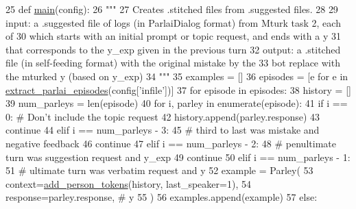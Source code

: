 \begin{DoxyCode}
25 \textcolor{keyword}{def }\hyperlink{namespaceprojects_1_1self__feeding_1_1scripts_1_1convert__suggested__to__stitched_a6616af45a9b73cd0314c3d585d66d5f8}{main}(config):
26     \textcolor{stringliteral}{"""}
27 \textcolor{stringliteral}{    Creates .stitched files from .suggested files.}
28 \textcolor{stringliteral}{}
29 \textcolor{stringliteral}{    input: a .suggested file of logs (in ParlaiDialog format) from Mturk task 2, each of}
30 \textcolor{stringliteral}{        which starts with an initial prompt or topic request, and ends with a y}
31 \textcolor{stringliteral}{        that corresponds to the y\_exp given in the previous turn}
32 \textcolor{stringliteral}{    output: a .stitched file (in self-feeding format) with the original mistake by the}
33 \textcolor{stringliteral}{        bot replace with the mturked y (based on y\_exp)}
34 \textcolor{stringliteral}{    """}
35     examples = []
36     episodes = [e \textcolor{keywordflow}{for} e \textcolor{keywordflow}{in} \hyperlink{namespaceprojects_1_1self__feeding_1_1utils_a7bfa2fe610a2d0da7968b1a2662e0c23}{extract\_parlai\_episodes}(config[\textcolor{stringliteral}{'infile'}])]
37     \textcolor{keywordflow}{for} episode \textcolor{keywordflow}{in} episodes:
38         history = []
39         num\_parleys = len(episode)
40         \textcolor{keywordflow}{for} i, parley \textcolor{keywordflow}{in} enumerate(episode):
41             \textcolor{keywordflow}{if} i == 0:  \textcolor{comment}{# Don't include the topic request}
42                 history.append(parley.response)
43                 \textcolor{keywordflow}{continue}
44             \textcolor{keywordflow}{elif} i == num\_parleys - 3:
45                 \textcolor{comment}{# third to last was mistake and negative feedback}
46                 \textcolor{keywordflow}{continue}
47             \textcolor{keywordflow}{elif} i == num\_parleys - 2:
48                 \textcolor{comment}{# penultimate turn was suggestion request and y\_exp}
49                 \textcolor{keywordflow}{continue}
50             \textcolor{keywordflow}{elif} i == num\_parleys - 1:
51                 \textcolor{comment}{# ultimate turn was verbatim request and y}
52                 example = Parley(
53                     context=\hyperlink{namespaceprojects_1_1self__feeding_1_1utils_a3f3d055dc6c4058057baae7b240de5ec}{add\_person\_tokens}(history, last\_speaker=1),
54                     response=parley.response,  \textcolor{comment}{# y}
55                 )
56                 examples.append(example)
57             \textcolor{keywordflow}{else}:

\end{DoxyCode}
